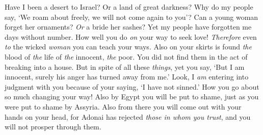 \begin{biblechapter}
Have I been a desert to Israel? Or a land of great darkness? 
Why do my people say, ‘We roam about freely, 
we will not come again to you’?
\verse Can a young woman forget her ornaments? \textit{Or} a bride her sashes? 
Yet my people have forgotten me days without number.
\verse How well you do \textit{on} your way to seek love! 
\textit{Therefore} even \textit{to} the wicked \textit{woman} you can teach your ways.
\verse Also on your skirts is found 
\textit{the} blood of \textit{the} life of \textit{the} innocent, \textit{the} poor. 
You did not find them in the act of breaking into a house. 
But in spite of all these \textit{things},
\verse yet you say, ‘But I am innocent, 
surely his anger has turned away from me.’ 
Look, I \textit{am} entering into judgment with you 
because of your saying, ‘I have not sinned.’
\verse How you go about so much changing your way! 
Also by Egypt you will be put to shame, 
just as you were put to shame by Assyria.
\verse Also from there you will come out 
with your hands on your head, 
for Adonai has rejected \textit{those in whom you trust}, 
and you will not prosper through them.
\end{biblechapter}

